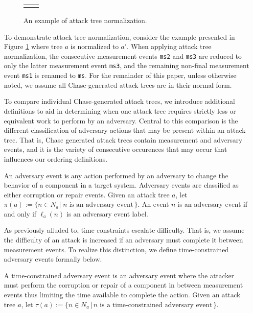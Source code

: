 \documentclass[runningheads]{llncs}
\theoremstyle{definition}
\begin{document}
\begin{figure}[htbp]
  \centering 
  \begin{tabular}{c c}
       &  
  \end{tabular}
  \captionsetup{justification=centering,margin=1cm}
  \caption[Example of attack tree normalization]{An example of attack tree normalization.}
  \label{fig:reduce-ex}
\end{figure}


\noindent To demonstrate attack tree normalization, consider the example presented in Figure \ref{fig:reduce-ex} where tree $a$ is normalized to $a'$. When applying attack tree normalization, the consecutive measurement events \texttt{ms2} and \texttt{ms3} are reduced to only the latter measurement event \texttt{ms3}, and the remaining non-final measurement event \texttt{ms1} is renamed to \texttt{ms}. For the remainder of this paper, unless otherwise noted, we assume all Chase-generated attack trees are in their normal form.

To compare individual Chase-generated attack trees, we introduce additional definitions to aid in determining when one attack tree requires strictly less or equivalent work to perform by an adversary. Central to this comparison is the different classification of adversary actions that may be present within an attack tree. That is, Chase generated attack trees contain measurement and adversary events, and it is the variety of consecutive occurences that may occur that influences our ordering definitions.  

\begin{definition}
    An adversary event is any action performed by an adversary to change the behavior of a component in a target system. Adversary events are classified as either corruption or repair events. Given an attack tree $a$, let $\pi(a) := \{n \in N_a \,|\, n \text{ is an adversary event}\,\}$. An event $n$ is an adversary event if and only if $\ell_a(n)$ is an adversary event label.
\end{definition}


As previously alluded to, time constraints escalate difficulty. That is, we assume the difficulty of an attack is increased if an adversary must complete it between measurement events. To realize this distinction, we define time-constrained adversary events formally below.  

\begin{definition}
    A time-constrained adversary event is an adversary event where the attacker must perform the corruption or repair of a component in between measurement events thus limiting the time available to complete the action. Given an attack tree $a$, let $\tau(a) := \{n \in N_a \,|\, n \text{ is a time-constrained adversary event}\,\}$.
\end{definition}
\end{document}
